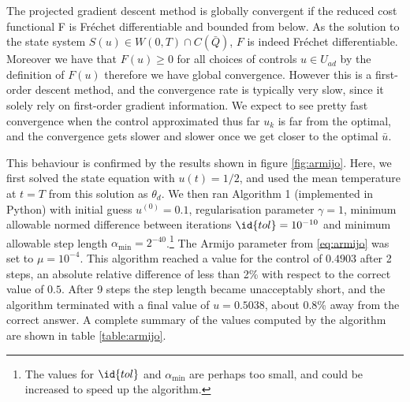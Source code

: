 The projected gradient descent method is globally convergent if the reduced cost functional F is Fréchet differentiable and bounded from below. As the solution to the state system $S(u) \in W(0,T) \cap C(\bar{Q})$, $F$ is indeed Fréchet differentiable. Moreover we have that $F(u) \geq 0$ for all choices of controls $u \in U_{ad}$ by the definition of $F(u)$ therefore we have global convergence. However this is a first-order descent method, and the convergence rate is typically very slow, since it solely rely on first-order gradient information. We expect to see pretty fast convergence when the control approximated thus far $u_k$ is far from the optimal, and the convergence gets slower and slower once we get closer to the optimal $\bar{u}$. \bigskip

This behaviour is confirmed by the results shown in figure \ref{fig:armijo}. Here, we first solved the state equation with $u(t) = 1/2$, and used the mean temperature at $t=T$ from this solution as $\theta_d$. We then ran Algorithm 1 (implemented in Python) with initial guess $u^{(0)} = 0.1$, regularisation parameter $\gamma = 1$, minimum allowable normed difference between iterations $\id{tol} = 10^{-10}$ and minimum allowable step length $\alpha_{\min} = 2^{-40}$.\footnote{The values for $\id{tol}$ and $\alpha_{\min}$ are perhaps too small, and could be increased to speed up the algorithm.} The Armijo parameter from \eqref{eq:armijo} was set to $\mu=10^{-4}$. This algorithm reached a value for the control of $0.4903$ after 2 steps, an absolute relative difference of less than 2\% with respect to the correct value of $0.5$. After 9 steps the step length became unacceptably short, and the algorithm terminated with a final value of $u=0.5038$, about 0.8\% away from the correct answer. A complete summary of the values computed by the algorithm are shown in table \ref{table:armijo}. 
